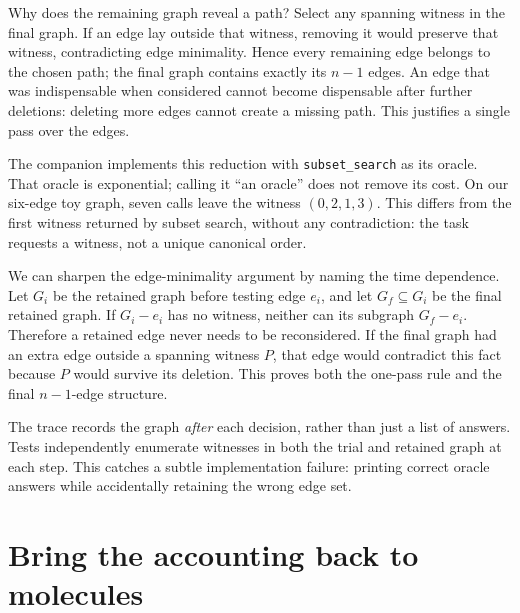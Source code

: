 Why does the remaining graph reveal a path? Select any spanning witness
in the final graph. If an edge lay outside that witness, removing it
would preserve that witness, contradicting edge minimality. Hence every
remaining edge belongs to the chosen path; the final graph contains
exactly its \(n-1\) edges. An edge that was indispensable when
considered cannot become dispensable after further deletions: deleting
more edges cannot create a missing path. This justifies a single pass
over the edges.

The companion implements this reduction with \texttt{subset\_search} as
its oracle. That oracle is exponential; calling it ``an oracle'' does
not remove its cost. On our six-edge toy graph, seven calls leave the
witness \((0,2,1,3)\). This differs from the first witness returned by
subset search, without any contradiction: the task requests a witness,
not a unique canonical order.


We can sharpen the edge-minimality argument by naming the time
dependence. Let \(G_i\) be the retained graph before testing edge
\(e_i\), and let \(G_f\subseteq G_i\) be the final retained graph. If
\(G_i-e_i\) has no witness, neither can its subgraph \(G_f-e_i\).
Therefore a retained edge never needs to be reconsidered. If the final
graph had an extra edge outside a spanning witness \(P\), that edge
would contradict this fact because \(P\) would survive its deletion.
This proves both the one-pass rule and the final \(n-1\)-edge structure.

The trace records the graph \emph{after} each decision, rather than just
a list of answers. Tests independently enumerate witnesses in both the
trial and retained graph at each step. This catches a subtle
implementation failure: printing correct oracle answers while
accidentally retaining the wrong edge set.

\section{Bring the accounting back to
molecules}\label{bring-the-accounting-back-to-molecules}

